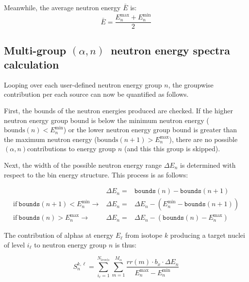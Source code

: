 \documentclass[10pt]{article}
\newcommand{\alphn}[0]{$\left(\alpha,n\right)$}
\begin{document}
Meanwhile, the average neutron energy $\bar{E}$ is:
\begin{equation}
\bar{E} = \frac{E_n^{\max} + E_n^{\min}}{2}
\end{equation}


\subsection{Multi-group \alphn\ neutron energy spectra calculation}

Looping over each user-defined neutron energy group $n$, the groupwise contribution per each source can now be quantified as follows.

First, the bounds of the neutron energies produced are checked. If the higher neutron energy group bound is below the minimum neutron energy ($\mathrm{bounds}\left(n\right) < E_n^{\min}$) or the lower neutron energy group bound is greater than the maximum neutron energy ($\mathrm{bounds}\left(n+1\right) > E_n^{\max}$), there are no possible \alphn contributions to energy group $n$ (and this this group is skipped).

Next, the width of the possible neutron energy range $\Delta E_n$ is determined with respect to the bin energy structure. This process is as follows:

\begin{eqnarray}
& \Delta E_n  = & \texttt{bounds}\left(n\right) - \texttt{bounds}\left(n+1\right) \\
\mathrm{if}\ \texttt{bounds}\left(n+1\right) < E_n^{\min} \rightarrow & \Delta E_n = & \Delta E_n - \left(E_n^{\min} - \texttt{bounds}\left(n+1\right) \right) \\
\mathrm{if}\ \texttt{bounds} \left(n\right) > E_n^{\max} \rightarrow & \Delta E_n = & \Delta E_n - \left( \texttt{bounds}\left(n\right) - E_n^{\max} \right) 
\end{eqnarray}

The contribution of alphas at energy $E_\ell$ from isotope $k$ producing a target nuclei of level $i_\ell$ to neutron energy group $n$ is thus:

\begin{equation}
S_n^{k,\ell} =  \sum_{i_\ell=1}^{N_{levels}} \sum_{m=1}^{M_\alpha}  \frac{rr\left(m\right)\cdot b_x \cdot \Delta E_n }{E_n^{\max} - E_n^{\min}}
\end{equation}
\end{document}
